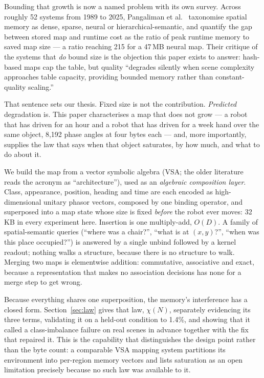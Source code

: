\documentclass[conference]{IEEEtran}
\begin{document}
Bounding that growth is now a named problem with its own survey. Across
roughly 52 systems from 1989 to 2025, Pangaliman et al.\
\cite{pangaliman2026memorysurvey} taxonomise spatial memory as dense,
sparse, neural or hierarchical-semantic, and quantify the gap between
stored map and runtime cost as the ratio of peak runtime memory to saved
map size --- a ratio reaching 215 for a 47\,MB neural map. Their critique
of the systems that \emph{do} bound size is the objection this paper
exists to answer: hash-based maps cap the table, but quality ``degrades
silently when scene complexity approaches table capacity, providing
bounded memory rather than constant-quality scaling.''

That sentence sets our thesis. Fixed size is not the contribution.
\emph{Predicted} degradation is. This paper characterises a map that does
not grow --- a robot that has driven for an hour and a robot that has
driven for a week hand over the same object, 8{,}192 phase angles at four
bytes each --- and, more importantly, supplies the law that says when
that object saturates, by how much, and what to do about it.

We build the map from a vector symbolic algebra (VSA; the older
literature reads the acronym as ``architecture''), used as an
\emph{algebraic composition layer}. Class, appearance, position, heading
and time are each encoded as high-dimensional unitary phasor vectors,
composed by one binding operator, and superposed into a map state whose
size is fixed \emph{before} the robot ever moves: 32\,KB in every
experiment here. Insertion is one multiply-add, $O(D)$. A family of
spatial-semantic queries (``where was a chair?'', ``what is at
$(x,y)$?'', ``when was this place occupied?'') is answered by a single
unbind followed by a kernel readout; nothing walks a structure, because
there is no structure to walk. Merging two maps is elementwise addition:
commutative, associative and exact, because a representation that makes
no association decisions has none for a merge step to get wrong.

Because everything shares one superposition, the memory's interference
has a closed form. Section~\ref{sec:law} gives that law, $\chi(N)$,
separately evidencing its three terms, validating it on a held-out
condition to 1.4\%, and showing that it called a class-imbalance failure
on real scenes in advance together with the fix that repaired it. This
is the capability that distinguishes the design point rather than the
byte count: a comparable VSA mapping system \cite{snyder2026vsaogm}
partitions its environment into per-region memory vectors and lists
saturation as an open limitation precisely because no such law was
available to it.
\end{document}
